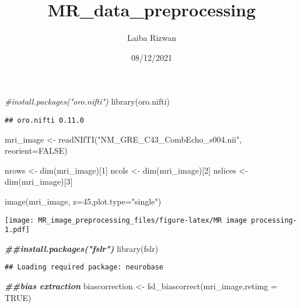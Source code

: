 \documentclass[
]{article}
\title{MR\_data\_preprocessing}
\author{Laiba Rizwan}
\date{08/12/2021}
\newenvironment{Shaded}{\begin{snugshade}}{\end{snugshade}}
\newcommand{\AttributeTok}[1]{\textcolor[rgb]{0.77,0.63,0.00}{#1}}
\newcommand{\CommentTok}[1]{\textcolor[rgb]{0.56,0.35,0.01}{\textit{#1}}}
\newcommand{\ConstantTok}[1]{\textcolor[rgb]{0.00,0.00,0.00}{#1}}
\newcommand{\DecValTok}[1]{\textcolor[rgb]{0.00,0.00,0.81}{#1}}
\newcommand{\DocumentationTok}[1]{\textcolor[rgb]{0.56,0.35,0.01}{\textbf{\textit{#1}}}}
\newcommand{\FunctionTok}[1]{\textcolor[rgb]{0.00,0.00,0.00}{#1}}
\newcommand{\NormalTok}[1]{#1}
\newcommand{\OtherTok}[1]{\textcolor[rgb]{0.56,0.35,0.01}{#1}}
\newcommand{\StringTok}[1]{\textcolor[rgb]{0.31,0.60,0.02}{#1}}
\begin{document}
\maketitle

\begin{Shaded}
\begin{Highlighting}[]
\CommentTok{\#install.packages("oro.nifti")}
\FunctionTok{library}\NormalTok{(oro.nifti)}
\end{Highlighting}
\end{Shaded}

\begin{verbatim}
## oro.nifti 0.11.0
\end{verbatim}

\begin{Shaded}
\begin{Highlighting}[]
\NormalTok{mri\_image }\OtherTok{\textless{}{-}} \FunctionTok{readNIfTI}\NormalTok{(}\StringTok{"NM\_GRE\_C43\_CombEcho\_s004.nii"}\NormalTok{, }\AttributeTok{reorient=}\ConstantTok{FALSE}\NormalTok{)}

\NormalTok{nrows }\OtherTok{\textless{}{-}} \FunctionTok{dim}\NormalTok{(mri\_image)[}\DecValTok{1}\NormalTok{]}
\NormalTok{ncols }\OtherTok{\textless{}{-}} \FunctionTok{dim}\NormalTok{(mri\_image)[}\DecValTok{2}\NormalTok{]}
\NormalTok{nslices }\OtherTok{\textless{}{-}} \FunctionTok{dim}\NormalTok{(mri\_image)[}\DecValTok{3}\NormalTok{]}


\FunctionTok{image}\NormalTok{(mri\_image, }\AttributeTok{z=}\DecValTok{45}\NormalTok{,}\AttributeTok{plot.type=}\StringTok{"single"}\NormalTok{) }
\end{Highlighting}
\end{Shaded}

\texttt{[image: MR\_image\_preprocessing\_files/figure-latex/MR image processing-1.pdf]}

\begin{Shaded}
\begin{Highlighting}[]
\DocumentationTok{\#\#install.packages("fslr")}
\FunctionTok{library}\NormalTok{(fslr)}
\end{Highlighting}
\end{Shaded}

\begin{verbatim}
## Loading required package: neurobase
\end{verbatim}

\begin{Shaded}
\begin{Highlighting}[]
\DocumentationTok{\#\#bias extraction }
\NormalTok{biascorrection }\OtherTok{\textless{}{-}} \FunctionTok{fsl\_biascorrect}\NormalTok{(mri\_image,}\AttributeTok{retimg =} \ConstantTok{TRUE}\NormalTok{)}
\end{Highlighting}
\end{Shaded}
\end{document}
